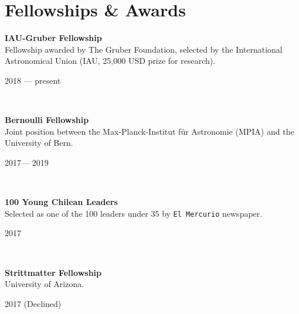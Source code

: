 \documentclass[12pt, a4paper]{article} %
\begin{document}
\section*{Fellowships \& Awards}

\begin{minipage}[t]{0.7\textwidth}
\begin{flushleft}%
  \setlength{\leftskip}{0.2cm}%
\textbf{IAU-Gruber Fellowship}\\
Fellowship awarded by The Gruber Foundation, selected by the International Astronomical Union (IAU, 25,000 USD prize for research).
\end{flushleft}
\end{minipage}
\begin{minipage}[t]{0.3\textwidth}
\hfill 2018 --- present
\end{minipage}\\

\begin{minipage}[t]{0.7\textwidth}
\begin{flushleft}%
  \setlength{\leftskip}{0.2cm}%
\textbf{Bernoulli Fellowship}\\
Joint position between the Max-Planck-Institut f\"ur Astronomie (MPIA) and the University of Bern.
\end{flushleft}
\end{minipage}
\begin{minipage}[t]{0.3\textwidth}
\hfill 2017--- 2019
\end{minipage}\\

\begin{minipage}[t]{0.7\textwidth}
\begin{flushleft}%
  \setlength{\leftskip}{0.2cm}%
\textbf{100 Young Chilean Leaders}\\
Selected as one of the 100 leaders under 35 by \texttt{El Mercurio} newspaper.
\end{flushleft}
\end{minipage}
\begin{minipage}[t]{0.3\textwidth}
\hfill 2017
\end{minipage}\\

\begin{minipage}[t]{0.7\textwidth}
\begin{flushleft}%
  \setlength{\leftskip}{0.2cm}%
\textbf{Strittmatter Fellowship}\\
University of Arizona.
\end{flushleft}
\end{minipage}
\begin{minipage}[t]{0.3\textwidth}
\hfill 2017 (Declined)
\end{minipage}\\
\end{document}
